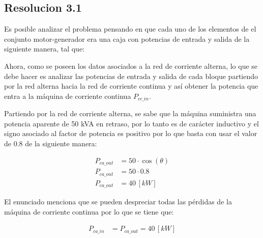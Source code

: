 \documentclass[
  11pt,
  letterpaper,
   addpoints,
   answers
  ]{exam}
\begin{document}
\begin{questions}
\begin{solution}
   \subsection*{Resolucion 3.1}
   Es posible analizar el problema pensando en que cada uno de los elementos de el conjunto motor-generador era una caja con potencias de entrada y salida de la siguiente manera, tal que:
   \begin{center}
    \end{center}
    Ahora, como se poseen los datos asociados a la red de corriente alterna, lo que se debe hacer es analizar las potencias de entrada y salida de cada bloque partiendo por la red alterna hacia la red de corriente continua y así obtener la potencia que entra a la máquina de corriente continua \( P_{cc\_in} \).
    
    Partiendo por la red de corriente alterna, se sabe que la máquina suministra una potencia aparente de 50 kVA en retraso, por lo tanto es de carácter inductivo y el signo asociado al factor de potencia es positivo por lo que basta con usar el valor de 0.8 de la siguiente manera:
    
    \begin{align}
    P_{ca\_out} &= 50 \cdot \cos(\theta) \\
    P_{ca\_out} &= 50 \cdot 0.8 \\
    P_{ca\_out} &= 40 \, [kW]
    \end{align}
    
    El enunciado menciona que se pueden despreciar todas las pérdidas de la máquina de corriente continua por lo que se tiene que:
    
    \begin{align}
    P_{ca\_in} &= P_{ca\_out} = 40 \, [kW]
    \end{align}
    

\end{solution}
\end{questions}
\end{document}
